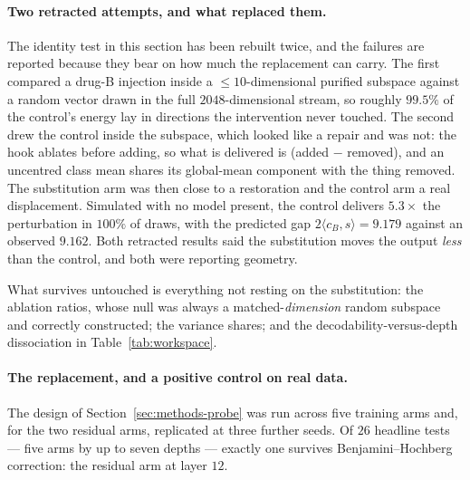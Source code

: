 \paragraph{Two retracted attempts, and what replaced them.} The identity test in this section has
been rebuilt twice, and the failures are reported because they bear on how much the replacement can
carry. The first compared a drug-B injection inside a $\leq 10$-dimensional purified subspace against
a random vector drawn in the full $2048$-dimensional stream, so roughly $99.5\%$ of the control's
energy lay in directions the intervention never touched. The second drew the control inside the
subspace, which looked like a repair and was not: the hook ablates before adding, so what is
delivered is (added $-$ removed), and an uncentred class mean shares its global-mean component with
the thing removed. The substitution arm was then close to a restoration and the control arm a real
displacement. Simulated with no model present, the control delivers $5.3\times$ the perturbation in
$100\%$ of draws, with the predicted gap $2\langle c_B, s\rangle = 9.179$ against an observed
$9.162$. Both retracted results said the substitution moves the output \emph{less} than the control,
and both were reporting geometry.

What survives untouched is everything not resting on the substitution: the ablation ratios, whose
null was always a matched-\emph{dimension} random subspace and correctly constructed; the variance
shares; and the decodability-versus-depth dissociation in Table~\ref{tab:workspace}.

\paragraph{The replacement, and a positive control on real data.} The design of
Section~\ref{sec:methods-probe} was run across five training arms and, for the two residual arms,
replicated at three further seeds. Of $26$ headline tests --- five arms by up to seven depths --- exactly
one survives Benjamini--Hochberg correction: the residual arm at layer $12$.

